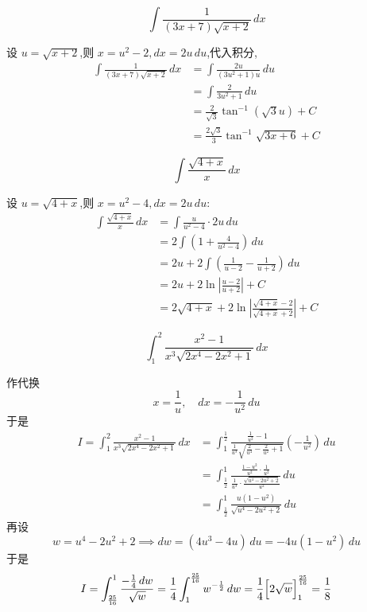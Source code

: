 \begin{questions}
    \question
    \[ 
    \int \frac{1}{(3x+7)\sqrt{x+2}} \,dx 
    \]
    \begin{solution}
        设 $u = \sqrt{x+2}$,则 $x = u^2 - 2, dx = 2u\,du$,代入积分,
        \begin{align*}
        \int \frac{1}{(3x+7)\sqrt{x+2}} \,dx 
        &= \int \frac{2u }{(3u^2 + 1)u}\,du \\
        &= \int \frac{2}{3u^2 + 1}\,du \\
        &= \frac{2}{\sqrt{3}} \tan^{-1}(\sqrt{3}u) + C \\
        &= \frac{2\sqrt{3}}{3} \tan^{-1}\sqrt{3x+6} + C
        \end{align*}
    \end{solution}

    \question
    \[
    \int \frac{\sqrt{4+x}}{x}\, dx
    \]
    \begin{solution}
        设 $u = \sqrt{4+x}$,则 $x = u^2 - 4,dx = 2u \, du$:
        \begin{align*}
        \int \frac{\sqrt{4+x}}{x}\, dx
        &= \int \frac{u}{u^2-4} \cdot 2u \, du \\
        &= 2 \int \left( 1 + \frac{4}{u^2-4} \right)\, du \\
        &= 2u + 2 \int \left( \frac{1}{u-2} - \frac{1}{u+2} \right)\, du \\
        &= 2u + 2 \ln\left| \frac{u-2}{u+2} \right| + C \\
        &= 2\sqrt{4+x} + 2\ln\left| \frac{\sqrt{4+x}-2}{\sqrt{4+x}+2} \right| + C
        \end{align*}
    \end{solution}

    \question
    \[
    \int_{1}^{2} \frac{x^{2}-1}{x^{3}\sqrt{2x^{4}-2x^{2}+1}} \, dx
    \]
    \begin{solution}
        作代换
        \[
        x=\frac{1}{u},\quad dx=-\frac{1}{u^{2}} \, du
        \]
        于是
        \begin{align*}
        I=\int_{1}^{2} \frac{x^{2}-1}{x^{3}\sqrt{2x^{4}-2x^{2}+1}} \, dx &= \int_{1}^{\frac{1}{2}} \frac{\frac{1}{u^{2}}-1}{\frac{1}{u^{3}}\sqrt{\frac{2}{u^{4}}-\frac{2}{u^{2}}+1}} \left( -\frac{1}{u^{2}} \right) \, du \\
        &= \int_{\frac{1}{2}}^{1} \frac{\frac{1-u^{2}}{u^{2}} \cdot \frac{1}{u^{2}}}{\frac{1}{u^{3}} \cdot \frac{\sqrt{u^{4}-2u^{2}+2}}{u^{2}}} \, du \\
        &= \int_{\frac{1}{2}}^{1} \frac{u(1-u^{2})}{\sqrt{u^{4}-2u^{2}+2}} \, du
        \end{align*}
        再设
        \[
        w = u^{4} - 2u^{2} + 2 \implies dw = (4u^{3}-4u) \, du = -4u(1-u^{2}) \, du
        \]
        于是
        \[
        I = \int_{\frac{25}{16}}^{1} \frac{-\frac{1}{4} \, dw}{\sqrt{w}} 
        = \frac{1}{4} \int_{1}^{\frac{25}{16}} w^{-\frac{1}{2}} \, dw 
        = \frac{1}{4} \Bigl[2\sqrt{w}\Bigr]_{1}^{\frac{25}{16}} 
        = \frac{1}{8}
        \]
    \end{solution}


\end{questions}
